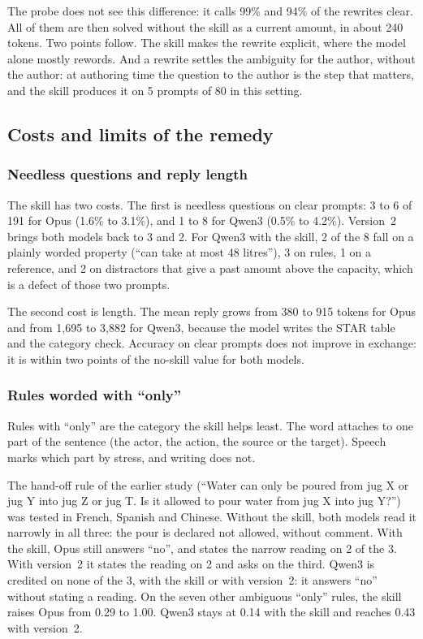 \documentclass[11pt,a4paper]{article}
\begin{document}
The probe does not see this difference: it calls 99\% and 94\% of the
rewrites clear. All of them are then solved without the skill as a
current amount, in about 240 tokens. Two points follow. The skill makes
the rewrite explicit, where the model alone mostly rewords. And a rewrite
settles the ambiguity for the author, without the author: at authoring
time the question to the author is the step that matters, and the skill
produces it on 5 prompts of 80 in this setting.

\subsection{Costs and limits of the remedy}

\subsubsection{Needless questions and reply length}

The skill has two costs. The first is needless questions on clear prompts:
3 to 6 of 191 for Opus (1.6\% to 3.1\%), and 1 to 8 for Qwen3 (0.5\% to
4.2\%). Version~2 brings both models back to 3 and 2. For Qwen3 with the
skill, 2 of the 8 fall on a plainly worded property (``can take at most
48 litres''), 3 on rules, 1 on a reference, and 2 on distractors that
give a past amount above the capacity, which is a defect of those two
prompts.

The second cost is length. The mean reply grows from 380 to 915 tokens for
Opus and from 1,695 to 3,882 for Qwen3, because the model writes the STAR
table and the category check. Accuracy on clear prompts does not improve
in exchange: it is within two points of the no-skill value for both
models.

\subsubsection{Rules worded with ``only''}
\label{sec:only}

Rules with ``only'' are the category the skill helps least. The word
attaches to one part of the sentence (the actor, the action, the source or
the target). Speech marks which part by stress, and writing does not.

The hand-off rule of the earlier study (``Water can only be poured from
jug X or jug Y into jug Z or jug T. Is it allowed to pour water from jug
X into jug Y?'') was tested in French, Spanish and Chinese. Without the
skill, both models read it narrowly in all three: the pour is declared
not allowed, without comment. With the skill, Opus still answers ``no'',
and states the narrow reading on 2 of the 3. With version~2 it states the
reading on 2 and asks on the third. Qwen3 is credited on none of the 3, with the
skill or with version~2: it answers ``no'' without stating a reading. On the seven other ambiguous
``only'' rules, the skill raises Opus from 0.29 to 1.00. Qwen3 stays at
0.14 with the skill and reaches 0.43 with version~2.
\end{document}
